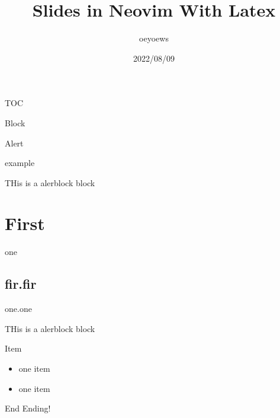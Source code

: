\documentclass{beamer}
\title{Slides in Neovim With Latex}
\author{oeyoews}
\date{2022/08/09}
\begin{document}
\begin{frame}[plain]
	\titlepage
\end{frame}

\begin{frame}{TOC}
	\tableofcontents
\end{frame}

\begin{frame}{Block}

	\begin{alertblock}{Alert}

	\end{alertblock}

	\begin{exampleblock}{example}

		THis is a alerblock block

	\end{exampleblock}

	\section{First}%
	\label{sec:First}
	one

	\subsection{fir.fir}%
	\label{sub:fir.fir}
	one.one

	THis is a alerblock block

\end{frame}


\begin{frame}{Item}

	\begin{itemize}
		\item  one item
		\item  one item
	\end{itemize}

\end{frame}

\begin{frame}{End}
	Ending!
\end{frame}
\end{document}
